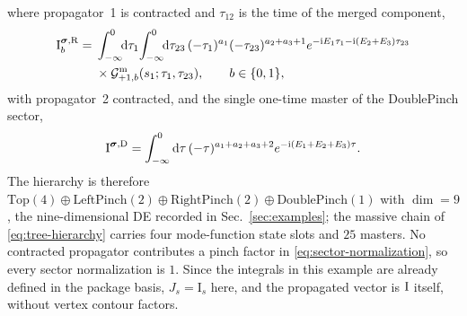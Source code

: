 \documentclass[11pt,a4paper]{article}
\numberwithin{table}{section}
\newcommand{\dd}{\mathrm d}
\newcommand{\ii}{\mathrm i}
\begin{document}
where propagator~1 is contracted and $\tau_{12}$ is the time of the merged component,
\begin{equation}
 \begin{aligned}
 \text{I}^{\boldsymbol\sigma,{\rm R}}_{b}
 ={}&\int_{-\infty}^{0}\!\!\dd\tau_1\!\int_{-\infty}^{0}\!\!\dd\tau_{23}\,
 (-\tau_1)^{a_1}(-\tau_{23})^{a_2+a_3+1}
 e^{-\ii E_1\tau_1-\ii(E_2+E_3)\tau_{23}}\\
 &\times\mathcal G^{\rm m}_{+1,b}(s_1;\tau_1,\tau_{23}),
 \qquad b\in\{0,1\},
 \end{aligned}
 \label{eq:ep-right-masters}
\end{equation}
with propagator~2 contracted, and the single one-time master of the DoublePinch sector,
\begin{equation}
 \text{I}^{\boldsymbol\sigma,{\rm D}}
 =\int_{-\infty}^{0}\dd\tau\,
 (-\tau)^{a_1+a_2+a_3+2}
 e^{-\ii(E_1+E_2+E_3)\tau}.
 \label{eq:ep-double-master}
\end{equation}
The hierarchy is therefore
$\mathrm{Top}(4)\oplus\mathrm{LeftPinch}(2)\oplus\mathrm{RightPinch}(2)\oplus
\mathrm{DoublePinch}(1)$ with $\dim=9$, the nine-dimensional DE recorded in
Sec.~\ref{sec:examples}; the massive chain of \eqref{eq:tree-hierarchy} carries four mode-function state slots
and $25$ masters. No contracted propagator contributes a pinch factor in
\eqref{eq:sector-normalization}, so every sector normalization is $1$. Since the integrals
in this example are already defined in the package basis, $J_s=\text{I}_s$ here, and the
propagated vector is $\bm{\text I}$ itself, without vertex contour factors.
\end{document}
